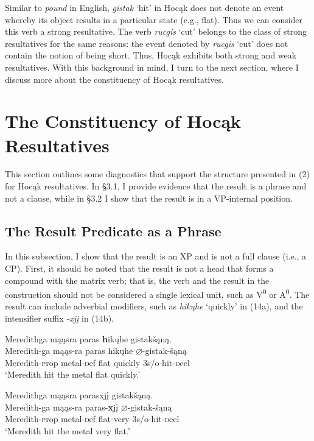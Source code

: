 \documentclass[output=paper]{LSP/langsci}
\begin{document}
Similar to \textit{pound} in English, \textit{gistak} `hit' in Hoc\k{a}k does not denote an event whereby its object results in a particular state (e.g., flat). Thus we can consider this verb a strong resultative. The verb \textit{rucgis} `cut' belongs to the class of strong resultatives for the same reasons: the event denoted by \textit{rucgis} `cut' does not contain the notion of being short. Thus, Hoc\k{a}k exhibits both strong and weak resultatives. With this background in mind, I turn to the next section, where I discuss more about the constituency of Hoc\k{a}k resultatives.

\section{The Constituency of Hoc\k{a}k Resultatives}

This section outlines some diagnostics that support the structure presented in (2) for Hoc\k{a}k resultatives. In \S 3.1, I provide evidence that the result is a phrase and not a clause, while in \S 3.2 I show that the result is in a VP-internal position.

\subsection{The Result Predicate as a Phrase}

In this subsection, I show that the result is an XP and is not a full clause (i.e., a CP). First, it should be noted that the result is not a head that forms a compound with the matrix verb; that is, the verb and the result in the construction should not be considered a single lexical unit, such as V\textsuperscript{0} or A\textsuperscript{0}. The result can include adverbial modifiers, such as \textit{hik\k{u}he} `quickly' in (14a), and the intensifier suffix \textit{-xj\k{i}} in (14b).

\begin{exe}
\ex
\begin{xlist}

\ex \glll Meredithga m\k{a}\k{a}sra paras {\textbf hik\k{u}he} gistak\v{s}\k{a}n\k{a}. \\
 Meredith-ga m\k{a}\k{a}s-ra paras hik\k{u}he $\varnothing$-gistak-\v{s}\k{a}n\k{a}\\
Meredith-{\textsc prop} metal-{\textsc def} flat quickly {\textsc 3s/o}-hit-{\textsc decl}\\ 
\glt `Meredith hit the metal flat quickly.'


\ex \glll Meredithga m\k{a}\k{a}sra parasxj\k{i} gistak\v{s}\k{a}n\k{a}.\\
 Meredith-ga m\k{a}\k{a}s-ra paras-{\textbf xj\k{i}} $\varnothing$-gistak-\v{s}\k{a}n\k{a}\\
Meredith-{\textsc prop} metal-{\textsc def} flat-very  {\textsc 3s/o}-hit-{\textsc decl}\\
\glt `Meredith hit the metal very flat.'

\end{xlist}
\end{exe}
\end{document}
